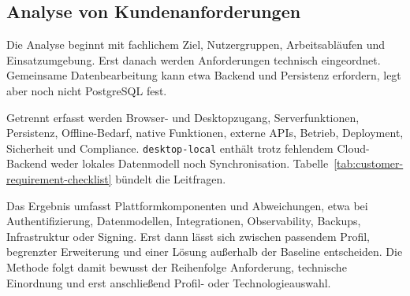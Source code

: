 \subsection{Analyse von Kundenanforderungen}
\label{subsec:analyse-kundenanforderungen}

Die Analyse beginnt mit fachlichem Ziel, Nutzergruppen, Arbeitsabläufen und
Einsatzumgebung. Erst danach werden Anforderungen technisch eingeordnet.
Gemeinsame Datenbearbeitung kann etwa Backend und Persistenz erfordern, legt
aber noch nicht PostgreSQL fest.

Getrennt erfasst werden Browser- und Desktopzugang, Serverfunktionen,
Persistenz, Offline-Bedarf, native Funktionen, externe APIs, Betrieb,
Deployment, Sicherheit und Compliance. \texttt{desktop-local} enthält trotz
fehlendem Cloud-Backend weder lokales Datenmodell noch Synchronisation.
Tabelle~\ref{tab:customer-requirement-checklist} bündelt die Leitfragen.



Das Ergebnis umfasst Plattformkomponenten und Abweichungen, etwa bei
Authentifizierung, Datenmodellen, Integrationen, Observability, Backups,
Infrastruktur oder Signing. Erst dann lässt sich zwischen passendem Profil,
begrenzter Erweiterung und einer Lösung außerhalb der Baseline entscheiden.
Die Methode folgt damit bewusst der Reihenfolge Anforderung, technische
Einordnung und erst anschließend Profil- oder Technologieauswahl.
